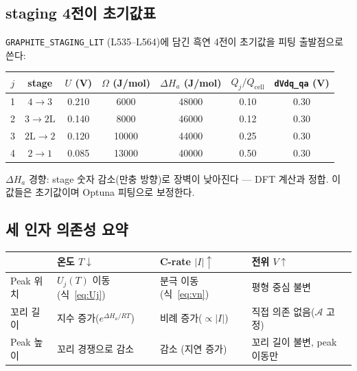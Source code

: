 \documentclass[11pt,a4paper]{article}
\newcommand{\cell}{\mathrm{cell}}
\begin{document}
\subsection{staging 4전이 초기값표}

\texttt{GRAPHITE\_STAGING\_LIT} (L535--L564)에 담긴 흑연 4전이
초기값을 피팅 출발점으로 쓴다:

\begin{center}
\renewcommand{\arraystretch}{1.35}
\begin{tabular}{ccccccc}
\toprule
$j$ & stage & $U$ (V) & $\Omega$ (J/mol) & $\Delta H_a$ (J/mol) & $Q_j/Q_\cell$
  & \texttt{dVdq\_qa} (V) \\
\midrule
1 & $4\to3$ & 0.210 & 6000 & 48000 & 0.10 & 0.30 \\
2 & $3\to2\mathrm{L}$ & 0.140 & 8000 & 46000 & 0.12 & 0.30 \\
3 & $2\mathrm{L}\to2$ & 0.120 & 10000 & 44000 & 0.25 & 0.30 \\
4 & $2\to1$ & 0.085 & 13000 & 40000 & 0.50 & 0.30 \\
\bottomrule
\end{tabular}
\end{center}
$\Delta H_a$ 경향: stage 숫자 감소(만충 방향)로 장벽이 낮아진다 — DFT 계산과 정합.
이 값들은 초기값이며 Optuna 피팅으로 보정한다.

\subsection{세 인자 의존성 요약}

\begin{center}
\renewcommand{\arraystretch}{1.35}
\begin{tabular}{p{} p{} p{} p{}}
\toprule
& \textbf{온도 $T\downarrow$} & \textbf{C-rate $|I|\uparrow$} & \textbf{전위 $V\uparrow$}\\
\midrule
Peak 위치 & $U_j(T)$ 이동 (식~\eqref{eq:Uj}) & 분극 이동 (식~\eqref{eq:vn}) & 평형 중심 불변\\
꼬리 길이 & 지수 증가($e^{\Delta H_a/RT}$) & 비례 증가($\propto|I|$) & 직접 의존 없음($\mathcal{A}$ 고정)\\
Peak 높이 & 꼬리 경쟁으로 감소 & 감소 (지연 증가) & 꼬리 길이 불변, peak 이동만\\
\bottomrule
\end{tabular}
\end{center}
\end{document}
